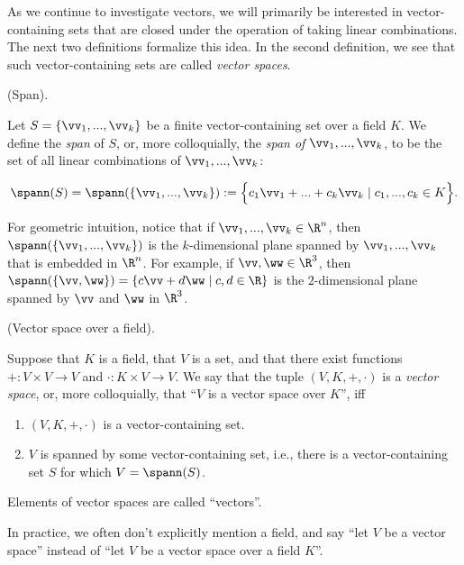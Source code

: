 As we continue to investigate vectors, we will primarily be interested in vector-containing sets that are closed under the operation of taking linear combinations. The next two definitions formalize this idea. In the second definition, we see that such vector-containing sets are called \textit{vector spaces}.

\begin{defn}
    (Span).
    
    Let $S = \{\vv_1, ..., \vv_k\}$ be a finite vector-containing set over a field $K$. We define the \textit{span} of $S$, or, more colloquially, the \textit{span of $\vv_1, ..., \vv_k$}, to be the set of all linear combinations of $\vv_1, ..., \vv_k$:
    
     \begin{align*}
        \spann(S) = \spann(\{\vv_1, ..., \vv_k\}) := \Big\{ c_1 \vv_1 + ... + c_k \vv_k \mid c_1, ..., c_k \in K \Big\}.
    \end{align*}
    
    For geometric intuition, notice that if $\vv_1, ..., \vv_k \in \R^n$, then $\spann(\{\vv_1, ..., \vv_k\})$ is the $k$-dimensional plane spanned by $\vv_1, ..., \vv_k$ that is embedded in $\R^n$. For example, if $\vv, \ww \in \R^3$, then ${\spann(\{\vv, \ww\}) = \{ c \vv + d \ww \mid c, d \in \R \}}$ is the $2$-dimensional plane spanned by $\vv$ and $\ww$ in $\R^3$.
\end{defn}

\begin{defn}
\label{ch::lin_alg::defn::vector_space}
    (Vector space over a field).
    
    Suppose that $K$ is a field, that $V$ is a set, and that there exist functions $+:V \times V \rightarrow V$ and $\cdot:K \times V \rightarrow V$. We say that the tuple $(V, K, +, \cdot)$ is a \textit{vector space}, or, more colloquially, that ``$V$ is a vector space over $K$'', iff 

    \begin{enumerate}
        \item $(V, K, +, \cdot)$ is a vector-containing set.
        \item $V$ is spanned by some vector-containing set, i.e., there is a vector-containing set $S$ for which $V = \spann(S)$. 
    \end{enumerate}
    
    Elements of vector spaces are called ``vectors''.
    
    In practice, we often don't explicitly mention a field, and say ``let $V$ be a vector space'' instead of ``let $V$ be a vector space over a field $K$''.
\end{defn}

